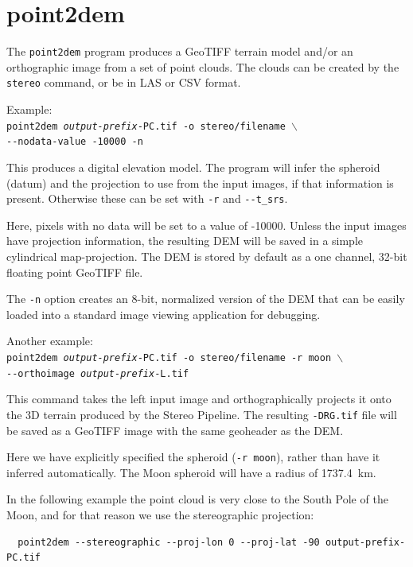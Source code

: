 \section{point2dem}
\label{point2dem}

The \texttt{point2dem} program produces a GeoTIFF terrain model and/or
an orthographic image from a set of point clouds. The clouds can be
created by the {\tt stereo} command, or be in LAS or CSV format.

Example:\\
\hspace*{2em}\texttt{point2dem \textit{output-prefix}-PC.tif -o stereo/filename $\backslash$} \\
\hspace*{4em}\texttt{-\/-nodata-value -10000 -n}

This produces a digital elevation model. The program will infer the
spheroid (datum) and the projection to use from the input images, if that
information is present. Otherwise these can be set with \texttt{-r} and \texttt{-\/-t\_srs}.

Here, pixels with no data will be set to a value of -10000. Unless the input
images have projection information, the resulting \ac{DEM} will be saved
in a simple cylindrical map-projection.  The \ac{DEM} is
stored by default as a one channel, 32-bit floating point GeoTIFF file.

The {\tt -n} option creates an 8-bit, normalized version of the DEM
that can be easily loaded into a standard image viewing application
for debugging.

Another example: \\
\hspace*{2em}\texttt{point2dem \textit{output-prefix}-PC.tif -o stereo/filename -r moon $\backslash$} \\
\hspace*{4em}\texttt{-\/-orthoimage \textit{output-prefix}-L.tif}

This command takes the left input image and orthographically projects
it onto the 3D terrain produced by the Stereo Pipeline.  The resulting
{\tt *-DRG.tif} file will be saved as a GeoTIFF image with the same
geoheader as the DEM.

Here we have explicitly specified the spheroid (\texttt{-r moon}), rather
than have it inferred automatically. The Moon spheroid will have
a radius of 1737.4~km.

In the following example the point cloud is very close to the
South Pole of the Moon, and for that reason we use the stereographic projection:
\begin{verbatim}
  point2dem --stereographic --proj-lon 0 --proj-lat -90 output-prefix-PC.tif
\end{verbatim}

